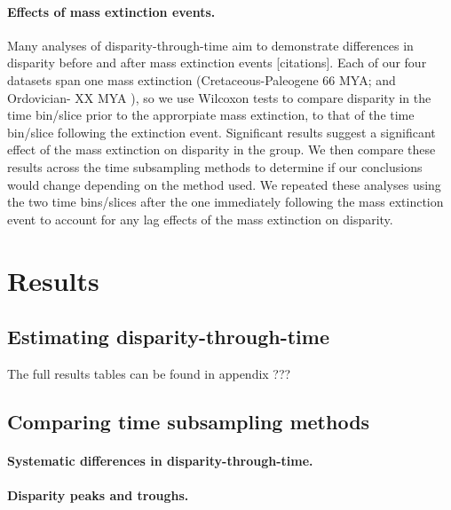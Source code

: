 \documentclass[12pt,a4paper]{article}
\begin{document}
\begin{enumerate}
\begin{enumerate}
\paragraph{Effects of mass extinction events.}
Many analyses of disparity-through-time aim to demonstrate differences in disparity before and after mass extinction events [citations]. 
Each of our four datasets span one mass extinction (Cretaceous-Paleogene 66 MYA; \cite{brusatte2014gradual,bapst2016topology,beckancient2014} and Ordovician- XX MYA \cite{wright2017bayesian}), so we use Wilcoxon tests to compare disparity in the time bin/slice prior to the approrpiate mass extinction, to that of the time bin/slice following the extinction event. 
Significant results suggest a significant effect of the mass extinction on disparity in the group.
We then compare these results across the time subsampling methods to determine if our conclusions would change depending on the method used.
We repeated these analyses using the two time bins/slices after the one immediately following the mass extinction event to account for any lag effects of the mass extinction on disparity.

\section{Results} 

\subsection{Estimating disparity-through-time}

The full results tables can be found in appendix ??? %


\subsection{Comparing time subsampling methods}

\paragraph{Systematic differences in disparity-through-time.} 

\paragraph{Disparity peaks and troughs.}


\end{enumerate}
\end{enumerate}
\end{document}
